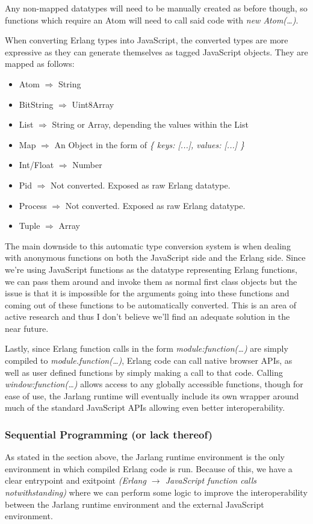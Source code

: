 \documentclass[twoside,12pt,titlepage,a4paper]{article}
\begin{document}
Any non-mapped datatypes will need to be manually created as before though, so functions which require an Atom will need to call said code with \textit{new Atom(\dots)}.

When converting Erlang types into JavaScript, the converted types are more expressive as they can generate themselves as tagged JavaScript objects. They are mapped as follows:

\begin{itemize}
\item Atom $\Rightarrow$ String
\item BitString $\Rightarrow$ Uint8Array
\item List $\Rightarrow$ String or Array, depending the values within the List
\item Map $\Rightarrow$ An Object in the form of \textit{\{ keys: [...], values: [...] \}}
\item Int/Float $\Rightarrow$ Number
\item Pid $\Rightarrow$ Not converted. Exposed as raw Erlang datatype.
\item Process $\Rightarrow$ Not converted. Exposed as raw Erlang datatype.
\item Tuple $\Rightarrow$ Array
\end{itemize}

The main downside to this automatic type conversion system is when dealing with anonymous functions on both the JavaScript side and the Erlang side. Since we're using JavaScript functions as the datatype representing Erlang functions, we can pass them around and invoke them as normal first class objects but the issue is that it is impossible for the arguments going into these functions and coming out of these functions to be automatically converted. This is an area of active research and thus I don't believe we'll find an adequate solution in the near future.

Lastly, since Erlang function calls in the form \textit{module:function(\dots)} are simply compiled to \textit{module.function(\dots)}, Erlang code can call native browser APIs, as well as user defined functions by simply making a call to that code. Calling \textit{window:function(\dots)} allows access to any globally accessible functions, though for ease of use, the Jarlang runtime will eventually include its own wrapper around much of the standard JavaScript APIs allowing even better interoperability.

\subsubsection{Sequential Programming (or lack thereof)}
As stated in the section above, the Jarlang runtime environment is the only environment in which compiled Erlang code is run. Because of this, we have a clear entrypoint and exitpoint \textit{(Erlang $\rightarrow$ JavaScript function calls notwithstanding)} where we can perform some logic to improve the interoperability between the Jarlang runtime environment and the external JavaScript environment.
\end{document}
